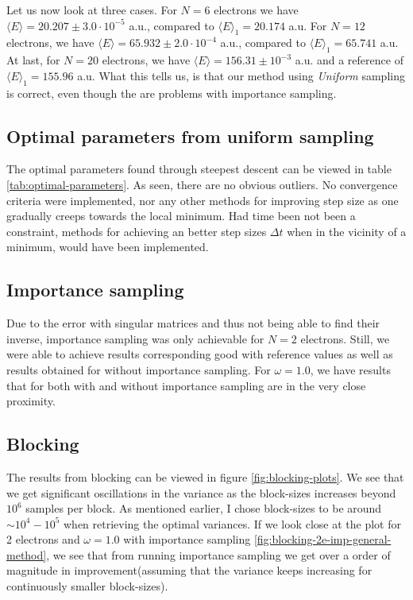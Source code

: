 \documentclass[11pt]{article}
\newcommand{\husk}[1]{\color{red} #1 \color{black}}
\begin{document}
Let us now look at three cases. For $N=6$ electrons we have $\langle E \rangle = 20.207\pm 3.0\cdot 10^{-5}$ a.u., compared to $\langle E \rangle_1 = 20.174$ a.u. For $N=12$ electrons, we have $\langle E \rangle = 65.932\pm 2.0\cdot 10^{-4}$ a.u., compared to $\langle E \rangle_1=65.741$ a.u. At last, for $N=20$ electrons, we have $\langle E \rangle = 156.31\pm 10^{-3}$ a.u. and a reference of $\langle E \rangle_1 = 155.96$ a.u. What this tells us, is that our method using \textit{Uniform} sampling is correct, even though the are problems with importance sampling.

\subsection{Optimal parameters from uniform sampling}
The optimal parameters found through steepest descent can be viewed in table \ref{tab:optimal-parameters}. As seen, there are no obvious outliers. No convergence criteria were implemented, nor any other methods for improving step size as one gradually creeps towards the local minimum. Had time been not been a constraint, methods for achieving an better step sizes $\Delta t$ when in the vicinity of a minimum, would have been implemented.

\subsection{Importance sampling}
Due to the error with singular matrices and thus not being able to find their inverse, importance sampling was only achievable for $N=2$ electrons. Still, we were able to achieve results corresponding good with reference values as well as results obtained for without importance sampling. For $\omega = 1.0$, we have results that for both with and without importance sampling are in the very close proximity.

\subsection{Blocking}
The results from blocking can be viewed in figure \ref{fig:blocking-plots}. We see that we get significant oscillations in the variance as the block-sizes increases beyond $10^6$ samples per block. As mentioned earlier, I chose block-sizes to be around $\sim 10^4-10^5$ when retrieving the optimal variances. If we look close at the plot for 2 electrons and $\omega = 1.0$ with importance sampling \ref{fig:blocking-2e-imp-general-method}, we see that from running importance sampling we get over a order of magnitude in improvement(assuming that the variance keeps increasing for continuously smaller block-sizes).
\end{document}
